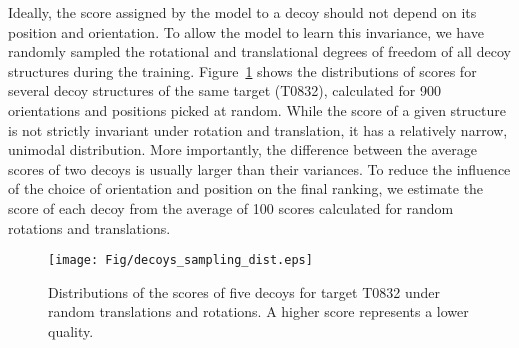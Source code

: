 Ideally, the score assigned by the model to a decoy should not depend
on its position and orientation.  To allow the model to learn this
invariance, we have randomly sampled the rotational and translational
degrees of freedom of all decoy structures during the training.
%
Figure~\ref{Fig:DecoysScoreDistribution} shows the distributions of
scores for several decoy structures of the same target (T0832),
calculated for 900 orientations and positions picked at random.
While the score of a given structure is not strictly invariant under
rotation and translation, it has a relatively narrow, unimodal
distribution.
More importantly, the difference between the average scores of two
decoys is usually larger than their variances. To reduce the influence
of the choice of orientation and position on the final ranking, we
estimate the score of each decoy from the average of 100 scores
calculated for random rotations and translations.






\begin{figure}[H]
    \centering
    \texttt{[image: Fig/decoys\_sampling\_dist.eps]}
%
    \caption{Distributions of the scores of five decoys for target
    T0832 under random translations and rotations. A higher score
    represents a lower quality.}
%
    \label{Fig:DecoysScoreDistribution}
\end{figure}

